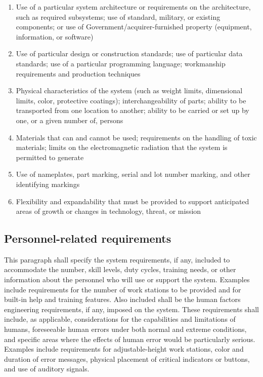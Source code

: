 \documentclass{fidata-report-template}
\begin{document}
\begin{enumerate}
\itemsep1pt\parskip0pt
\item
  Use of a particular system architecture or requirements on the
  architecture, such as required subsystems; use of standard, military,
  or existing components; or use of Government/acquirer-furnished
  property (equipment, information, or software)
\item
  Use of particular design or construction standards; use of particular
  data standards; use of a particular programming language; workmanship
  requirements and production techniques
\item
  Physical characteristics of the system (such as weight limits,
  dimensional limits, color, protective coatings); interchangeability of
  parts; ability to be transported from one location to another; ability
  to be carried or set up by one, or a given number of, persons
\item
  Materials that can and cannot be used; requirements on the handling of
  toxic materials; limits on the electromagnetic radiation that the
  system is permitted to generate
\item
  Use of nameplates, part marking, serial and lot number marking, and
  other identifying markings
\item
  Flexibility and expandability that must be provided to support
  anticipated areas of growth or changes in technology, threat, or
  mission
\end{enumerate}

\subsection{Personnel-related requirements}

This paragraph shall specify the system requirements, if any, included
to accommodate the number, skill levels, duty cycles, training needs, or
other information about the personnel who will use or support the
system. Examples include requirements for the number of work stations to
be provided and for built-in help and training features. Also included
shall be the human factors engineering requirements, if any, imposed on
the system. These requirements shall include, as applicable,
considerations for the capabilities and limitations of humans,
foreseeable human errors under both normal and extreme conditions, and
specific areas where the effects of human error would be particularly
serious. Examples include requirements for adjustable-height work
stations, color and duration of error messages, physical placement of
critical indicators or buttons, and use of auditory signals.
\end{document}

